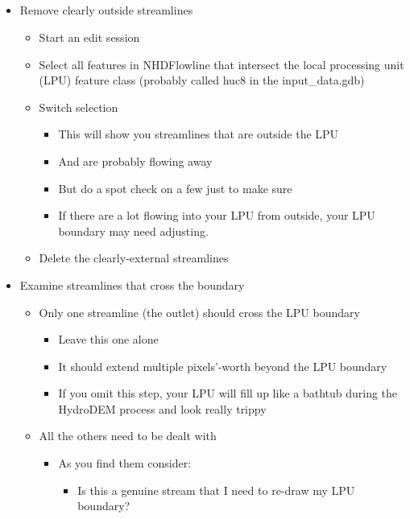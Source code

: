 \documentclass[letterpaper,10pt,english]{sphinxmanual}
\begin{document}
\subparagraph{}
\label{\detokenize{ex_1:workflow}}\begin{itemize}
\item {} 
Remove clearly outside streamlines
\begin{itemize}
\item {} 
Start an edit session

\item {} 
Select all features in NHDFlowline that intersect the local processing unit (LPU) feature class (probably called huc8 in the input\_data.gdb)

\item {} 
Switch selection
\begin{itemize}
\item {} 
This will show you streamlines that are outside the LPU

\item {} 
And are probably flowing away

\item {} 
But do a spot check on a few just to make sure

\item {} 
If there are a lot flowing into your LPU from outside, your LPU boundary may need adjusting.

\end{itemize}

\item {} 
Delete the clearly-external streamlines

\end{itemize}

\item {} 
Examine streamlines that cross the boundary
\begin{itemize}
\item {} 
Only one streamline (the outlet) should cross the LPU boundary
\begin{itemize}
\item {} 
Leave this one alone

\item {} 
It should extend multiple pixels’-worth beyond the LPU boundary

\item {} 
If you omit this step, your LPU will fill up like a bathtub during the HydroDEM process and look really trippy

\end{itemize}

\item {} 
All the others need to be dealt with
\begin{itemize}
\item {} 
As you find them consider:
\begin{itemize}
\item {} 
Is this a genuine stream that I need to re-draw my LPU boundary?


\end{itemize}
\end{itemize}
\end{itemize}
\end{itemize}
\end{document}
